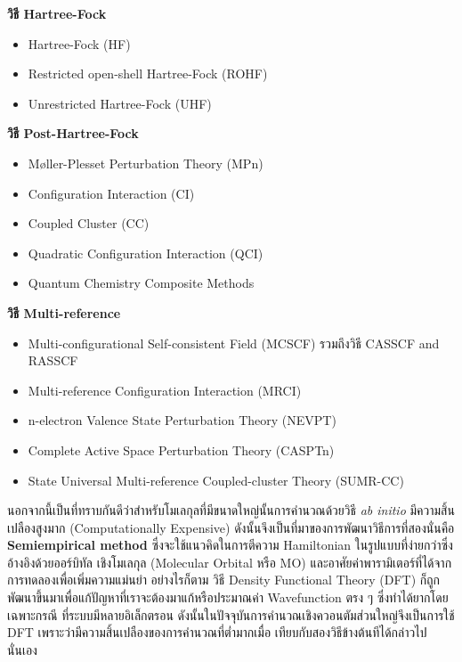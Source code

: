 \noindent \textbf{วิธี Hartree-Fock}
\begin{itemize}[topsep=0pt,noitemsep]
    \item Hartree-Fock (HF)
    \item Restricted open-shell Hartree-Fock (ROHF)
    \item Unrestricted Hartree-Fock (UHF)
\end{itemize}

\noindent \textbf{วิธี Post-Hartree-Fock}
\begin{itemize}[topsep=0pt,noitemsep]
    \item Møller-Plesset Perturbation Theory (MPn)
    \item Configuration Interaction (CI)
    \item Coupled Cluster (CC)
    \item Quadratic Configuration Interaction (QCI)
    \item Quantum Chemistry Composite Methods
\end{itemize}

\noindent \textbf{วิธี Multi-reference}
\begin{itemize}[topsep=0pt,noitemsep]
    \item Multi-configurational Self-consistent Field (MCSCF) รวมถึงวิธี CASSCF and RASSCF
    \item Multi-reference Configuration Interaction (MRCI)
    \item n-electron Valence State Perturbation Theory (NEVPT)
    \item Complete Active Space Perturbation Theory (CASPTn)
    \item State Universal Multi-reference Coupled-cluster Theory (SUMR-CC)
\end{itemize}

นอกจากนี้เป็นที่ทราบกันดีว่าสำหรับโมเลกุลที่มีขนาดใหญ่นั้นการคำนวณด้วยวิธี \textit{ab initio} มีความสิ้นเปลืองสูงมาก (Computationally 
Expensive)\autocite{grabowski2011} ดังนั้นจึงเป็นที่มาของการพัฒนาวิธีการที่สองนั่นคือ \textbf{Semiempirical method}%
\autocite{thiel2014,christensen2016,kriz2020} ซึ่งจะใช้แนวคิดในการตีความ Hamiltonian ในรูปแบบที่ง่ายกว่าซึ่งอ้างอิงด้วยออร์บิทัล%
เชิงโมเลกุล (Molecular Orbital หรือ MO) และอาศัยค่าพารามิเตอร์ที่ได้จากการทดลองเพื่อเพิ่มความแม่นยำ อย่างไรก็ตาม วิธี Density 
Functional Theory (DFT) ก็ถูกพัฒนาขึ้นมาเพื่อแก้ปัญหาที่เราจะต้องมาแก้หรือประมาณค่า Wavefunction ตรง ๆ ซึ่งทำได้ยากโดยเฉพาะกรณี%
ที่ระบบมีหลายอิเล็กตรอน ดังนั้นในปัจจุบันการคำนวณเชิงควอนตัมส่วนใหญ่จึงเป็นการใช้ DFT เพราะว่ามีความสิ้นเปลืองของการคำนวณที่ต่ำมากเมื่อ%
เทียบกับสองวิธีข้างต้นทีได้กล่าวไปนั่นเอง

